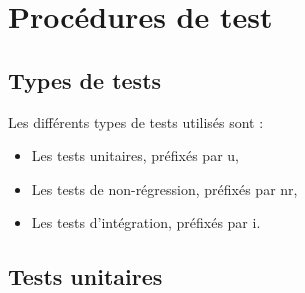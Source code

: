 \documentclass{../res/univ-projet}
\begin{document}
\section{Procédures de test}

\subsection{Types de tests}

  Les différents types de tests utilisés sont :
  \begin{itemize}
   \item Les tests unitaires, préfixés par u,
   \item Les tests de non-régression, préfixés par nr,
   \item Les tests d'intégration, préfixés par i.
  \end{itemize}
  

\subsection{Tests unitaires}
\end{document}
